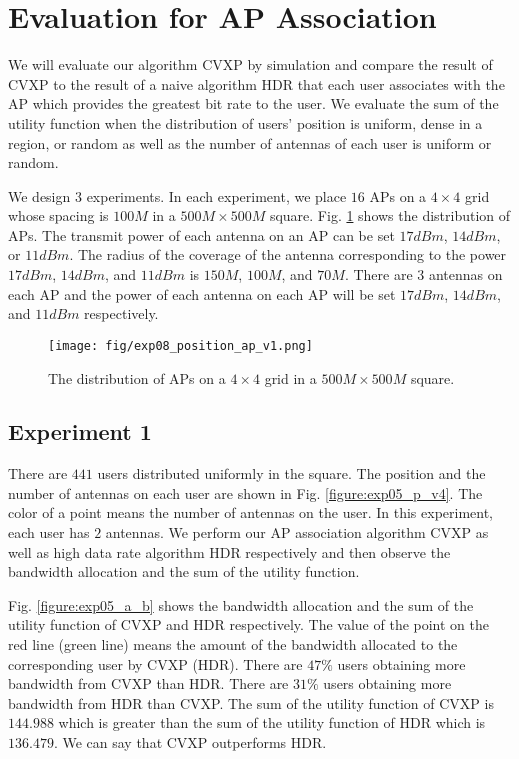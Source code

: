\section{Evaluation for AP Association}
	We will evaluate our algorithm CVXP by simulation and compare the result of CVXP to the result of a naive algorithm HDR that each user associates with the AP which provides the greatest bit rate to the user. We evaluate the sum of the utility function when the distribution of users' position is uniform, dense in a region, or random as well as the number of antennas of each user is uniform or random.
	
	We design $3$ experiments. In each experiment, we place $16$ APs on a $4\times4$ grid whose spacing is $100 M$ in a $500M \times 500M$ square. Fig. \ref{figure:exp08_p_a_v1} shows the distribution of APs. The transmit power of each antenna on an AP can be set $17 dBm$, $14 dBm$, or $11 dBm$. The radius of the coverage of the antenna corresponding to the power $17 dBm$, $14 dBm$, and $11 dBm$ is $150 M$, $100 M$, and $70 M$. There are $3$ antennas on each AP and the power of each antenna on each AP will be set $17 dBm$, $14 dBm$, and $11 dBm$ respectively.

		\begin{figure}
			\begin{center}
				\texttt{[image: fig/exp08\_position\_ap\_v1.png]}
				\caption{The distribution of APs on a $4 \times 4$ grid in a $500M \times 500M$ square.}
				\label{figure:exp08_p_a_v1}
			\end{center}
		\end{figure}

\subsection{Experiment 1}
	There are $441$ users distributed uniformly in the square. The position and the number of antennas on each user are shown in Fig. \ref{figure:exp05_p_v4}. The color of a point means the number of antennas on the user. In this experiment, each user has $2$ antennas. We perform our AP association algorithm CVXP as well as high data rate algorithm HDR respectively and then observe the bandwidth allocation and the sum of the utility function.

	
	Fig. \ref{figure:exp05_a_b} shows the bandwidth allocation and the sum of the utility function of CVXP and HDR respectively. The value of the point on the red line (green line) means the amount of the bandwidth allocated to the corresponding user by CVXP (HDR). There are $47\%$ users obtaining more bandwidth from CVXP than HDR. There are $31\%$ users obtaining more bandwidth from HDR than CVXP. The sum of the utility function of CVXP is $144.988$ which is greater than the sum of the utility function of HDR which is $136.479$. We can say that CVXP outperforms HDR.
	
